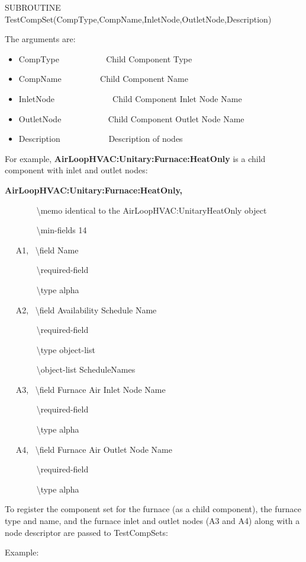 SUBROUTINE TestCompSet(CompType,CompName,InletNode,OutletNode,Description)

The arguments are:

\begin{itemize}
\item
  CompType ~~~~~~~~~~ Child Component Type
\item
  CompName ~~~~~~~~ Child Component Name
\item
  InletNode ~ ~~~~~~~~~~~ Child Component Inlet Node Name
\item
  OutletNode ~~~~~~~~~~ Child Component Outlet Node Name
\item
  Description~~~~~~~~~~~ Description of nodes
\end{itemize}

For example, \textbf{AirLoopHVAC:Unitary:Furnace:HeatOnly} is a child component with inlet and outlet nodes:

\textbf{AirLoopHVAC:Unitary:Furnace:HeatOnly,}

~~~~~~~ \textbackslash{}memo identical to the AirLoopHVAC:UnitaryHeatOnly object

~~~~~~~ \textbackslash{}min-fields 14

~~ A1,~ \textbackslash{}field Name

~~~~~~~ \textbackslash{}required-field

~~~~~~~ \textbackslash{}type alpha

~~ A2,~ \textbackslash{}field Availability Schedule Name

~~~~~~~ \textbackslash{}required-field

~~~~~~~ \textbackslash{}type object-list

~~~~~~~ \textbackslash{}object-list ScheduleNames

~~ A3,~ \textbackslash{}field Furnace Air Inlet Node Name

~~~~~~~ \textbackslash{}required-field

~~~~~~~ \textbackslash{}type alpha

~~ A4,~ \textbackslash{}field Furnace Air Outlet Node Name

~~~~~~~ \textbackslash{}required-field

~~~~~~~ \textbackslash{}type alpha

To register the component set for the furnace (as a child component), the furnace type and name, and the furnace inlet and outlet nodes (A3 and A4) along with a node descriptor are passed to TestCompSets:

Example:

